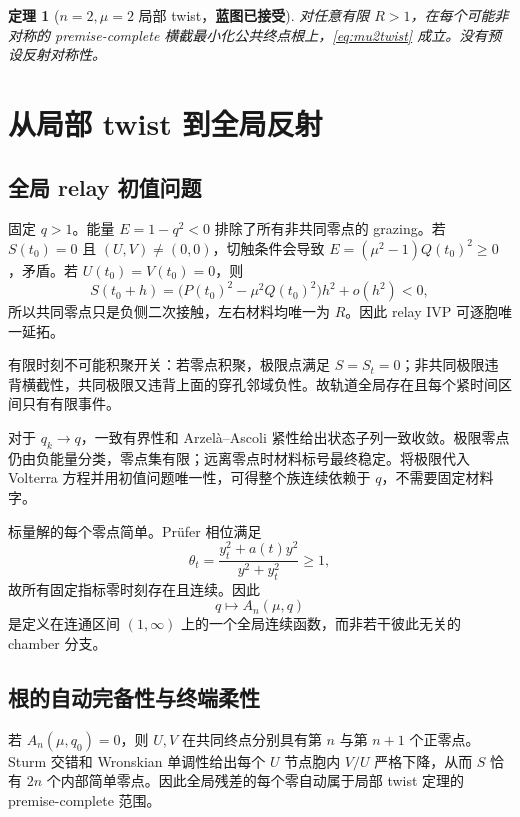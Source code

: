 \documentclass[UTF8,12pt,openany,fontset=fandol]{ctexrep}
\newtheorem{theorem}{定理}[chapter]
\theoremstyle{definition}
\newcommand{\Trusted}{\textcolor{green!45!black}{\textbf{蓝图已接受}}}
\begin{document}
\begin{theorem}[$n=2,\mu=2$ 局部 twist，\Trusted]
对任意有限 $R>1$，在每个可能非对称的 premise-complete 横截最小化公共终点根上，\eqref{eq:mu2twist} 成立。没有预设反射对称性。
\end{theorem}

\chapter{从局部 twist 到全局反射}

\section{全局 relay 初值问题}

固定 $q>1$。能量 $E=1-q^2<0$ 排除了所有非共同零点的 grazing。若 $S(t_0)=0$ 且 $(U,V)\ne(0,0)$，切触条件会导致 $E=(\mu^2-1)Q(t_0)^2\ge0$，矛盾。若 $U(t_0)=V(t_0)=0$，则
\begin{equation}
 S(t_0+h)=\bigl(P(t_0)^2-\mu^2Q(t_0)^2\bigr)h^2+o(h^2)<0,
\end{equation}
所以共同零点只是负侧二次接触，左右材料均唯一为 $R$。因此 relay IVP 可逐胞唯一延拓。

有限时刻不可能积聚开关：若零点积聚，极限点满足 $S=S_t=0$；非共同极限违背横截性，共同极限又违背上面的穿孔邻域负性。故轨道全局存在且每个紧时间区间只有有限事件。

对于 $q_k\to q$，一致有界性和 Arzelà--Ascoli 紧性给出状态子列一致收敛。极限零点仍由负能量分类，零点集有限；远离零点时材料标号最终稳定。将极限代入 Volterra 方程并用初值问题唯一性，可得整个族连续依赖于 $q$，不需要固定材料字。

标量解的每个零点简单。Prüfer 相位满足
\begin{equation}
 \theta_t=\frac{y_t^2+a(t)y^2}{y^2+y_t^2}\ge1,
\end{equation}
故所有固定指标零时刻存在且连续。因此
\begin{equation}
 q\mapsto A_n(\mu,q)
\end{equation}
是定义在连通区间 $(1,\infty)$ 上的一个全局连续函数，而非若干彼此无关的 chamber 分支。

\section{根的自动完备性与终端柔性}

若 $A_n(\mu,q_0)=0$，则 $U,V$ 在共同终点分别具有第 $n$ 与第 $n+1$ 个正零点。Sturm 交错和 Wronskian 单调性给出每个 $U$ 节点胞内 $V/U$ 严格下降，从而 $S$ 恰有 $2n$ 个内部简单零点。因此全局残差的每个零自动属于局部 twist 定理的 premise-complete 范围。
\end{document}
